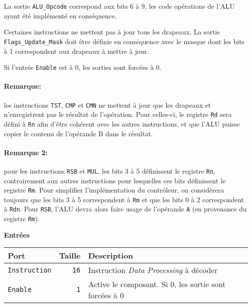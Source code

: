 \documentclass{article}
\begin{document}
    La sortie \texttt{ALU\_Opcode} correspond aux bits 6 à 9, les code opérations de l'ALU ayant été implémenté en conséquence.

    Certaines instructions ne mettent pas à jour tous les drapeaux.
    La sortie \texttt{Flags\_Update\_Mask} doit être définie en conséquence avec le masque dont les bits à 1 correspondent aux drapeaux à mettre à jour.

    Si l'entrée \texttt{Enable} est à 0, les sorties sont forcées à 0.

    \paragraph{Remarque:} les instructions \texttt{TST}, \texttt{CMP} et \texttt{CMN} ne mettent à jour que les drapeaux et n'enregistrent pas le résultat de l'opération.
    Pour celles-ci, le registre \texttt{Rd} sera défini à \texttt{Rn} afin d'être cohérent avec les autres instructions, et que l'ALU puisse copier le contenu de l'opérande B dans le résultat.

    \paragraph{Remarque 2:} pour les instructions \texttt{RSB} et \texttt{MUL}, les bits 3 à 5 définissent le registre \texttt{Rn}, contrairement aux autres instructions pour lesquelles ces bits définissent le registre \texttt{Rm}.
    Pour simplifier l'implémentation du contrôleur, on considèrera toujours que les bits 3 à 5 correspondent à \texttt{Rm} et que les bits 0 à 2 correspondent à \texttt{Rdn}.
    Pour \texttt{RSB}, l'ALU devra alors faire usage de l'opérande \texttt{A} (en provenance du registre \texttt{Rm}).



    \textbf{Entrées}\\

    \begin{tabular}{|l|r|l|}
        \hline
        \textbf{Port}       & \textbf{Taille} & \textbf{Description}                                   \\
        \hline

        \texttt{Instruction} & \texttt{16}     & Instruction \textit{Data Processing} à décoder         \\
        \hline
        \texttt{Enable}     & \texttt{1}      & Active le composant.
        Si 0, les sortie sont forcées à 0 \\


        \hline
    \end{tabular}
\end{document}
